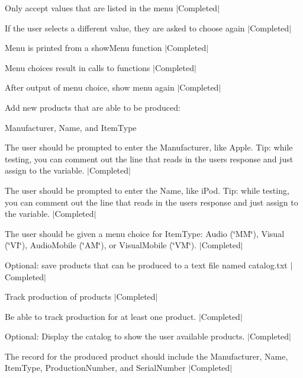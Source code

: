 \begin{DoxyEnumerate}
\item Only accept values that are listed in the menu $\vert$\+Completed$\vert$
\item If the user selects a different value, they are asked to choose again $\vert$\+Completed$\vert$
\item Menu is printed from a show\+Menu function $\vert$\+Completed$\vert$
\item Menu choices result in calls to functions $\vert$\+Completed$\vert$
\item After output of menu choice, show menu again $\vert$\+Completed$\vert$
\item Add new products that are able to be produced\+:
\begin{DoxyItemize}
\item Manufacturer, Name, and Item\+Type
\item The user should be prompted to enter the Manufacturer, like Apple. Tip\+: while testing, you can comment out the line that reads in the user\textquotesingle{}s response and just assign to the variable. $\vert$\+Completed$\vert$
\item The user should be prompted to enter the Name, like i\+Pod. Tip\+: while testing, you can comment out the line that reads in the user\textquotesingle{}s response and just assign to the variable. $\vert$\+Completed$\vert$
\item The user should be given a menu choice for Item\+Type\+: Audio (\char`\"{}\+M\+M\char`\"{}), Visual (\char`\"{}\+V\+I\char`\"{}), Audio\+Mobile (\char`\"{}\+A\+M\char`\"{}), or Visual\+Mobile (\char`\"{}\+V\+M\char`\"{}). $\vert$\+Completed$\vert$
\item Optional\+: save products that can be produced to a text file named catalog.\+txt $\vert$\+Completed$\vert$
\end{DoxyItemize}
\item Track production of products $\vert$\+Completed$\vert$
\begin{DoxyItemize}
\item Be able to track production for at least one product. $\vert$\+Completed$\vert$
\begin{DoxyEnumerate}
\item Optional\+: Display the catalog to show the user available products. $\vert$\+Completed$\vert$
\end{DoxyEnumerate}
\item The record for the produced product should include the Manufacturer, Name, Item\+Type, Production\+Number, and Serial\+Number $\vert$\+Completed$\vert$

\end{DoxyItemize}
\end{DoxyEnumerate}
